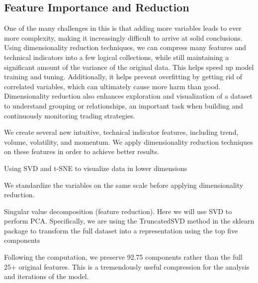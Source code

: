 \noindent



\subsection{Feature Importance and Reduction}

One of the many challenges in this is that adding more variables leads
to ever more complexity, making it increasingly difficult to arrive at solid conclusions.
Using dimensionality reduction techniques, we can compress many features
and technical indicators into a few logical collections, while still maintaining a significant
amount of the variance of the original data. This helps speed up model training
and tuning. Additionally, it helps prevent overfitting by getting rid of correlated variables,
which can ultimately cause more harm than good. Dimensionality reduction
also enhances exploration and visualization of a dataset to understand grouping or
relationships, an important task when building and continuously monitoring trading
strategies.


We create several new
intuitive, technical indicator features, including trend, volume, volatility, and
momentum. We apply dimensionality reduction techniques on these features in
order to achieve better results.

Using SVD and t-SNE to visualize data in lower dimensions

We standardize the variables on the same scale before applying dimensionality reduction.

Singular value decomposition (feature reduction). Here we will use SVD to perform
PCA. Specifically, we are using the TruncatedSVD method in the sklearn package to
transform the full dataset into a representation using the top five components


Following the computation, we preserve 92.75%
components rather than the full 25+ original features. This is a tremendously useful
compression for the analysis and iterations of the model.

